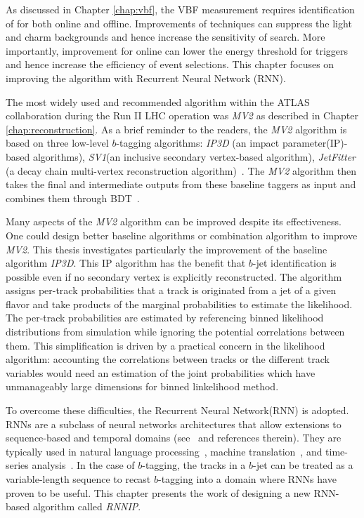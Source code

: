As discussed in Chapter \ref{chap:vbf}, the VBF \Hbb measurement requires identification of \bjets for both online and offline. Improvements of \btagging techniques can suppress the light and charm backgrounds and hence increase the sensitivity of \Hbb search. More importantly, improvement for online \btagging can lower the energy threshold for \bjet triggers and hence increase the efficiency of \Hbb event selections. This chapter focuses on improving the \btagging algorithm with Recurrent Neural Network (RNN). 

The most widely used and recommended \btagging algorithm within the ATLAS collaboration during the Run II LHC operation was \textit{MV2} as described in Chapter \ref{chap:reconstruction}. As a brief reminder to the readers, the \textit{MV2} algorithm is based on three low-level $b$-tagging algorithms: \textit{IP3D} (an impact parameter(IP)-based algorithms), \textit{SV1}(an inclusive secondary vertex-based algorithm), \textit{JetFitter} (a decay chain multi-vertex reconstruction algorithm)~\cite{ref:btagPaper}. The \textit{MV2} algorithm then takes the final and intermediate outputs from these baseline taggers as input and combines them through BDT~\cite{ATL-PHYS-PUB-2016-012}.

Many aspects of the \textit{MV2} algorithm can be improved despite its effectiveness. One could design better baseline algorithms or combination algorithm to improve \textit{MV2}. This thesis investigates particularly the improvement of the baseline algorithm \textit{IP3D}. This IP algorithm has the benefit that $b$-jet identification is possible even if no secondary vertex is explicitly reconstructed. The algorithm assigns per-track probabilities that a track is originated from a jet of a given flavor and take products of the marginal probabilities to estimate the likelihood. The per-track probabilities are estimated by referencing binned likelihood distributions from simulation while ignoring the potential correlations between them. This simplification is driven by a practical concern in the likelihood algorithm: accounting the correlations between tracks or the different track variables would need an estimation of the joint probabilities which have unmanageably large dimensions for binned linkelihood method.

To overcome these difficulties, the Recurrent Neural Network(RNN) is adopted. RNNs are a subclass of neural networks architectures that allow extensions to sequence-based and temporal domains (see~\cite{ref:RNNthesis} and references therein). They are typically used in natural language processing~\cite{languagemodel,DBLP:journals/corr/abs-1303-5778}, machine translation~\cite{MT,MT2}, and time-series analysis~\cite{timeseries,timeseries2}. In the case of $b$-tagging, the tracks in a $b$-jet can be treated as a variable-length sequence to recast $b$-tagging into a domain where RNNs have proven to be useful. This chapter presents the work of designing a new RNN-based \btagging algorithm called \textit{RNNIP}.
